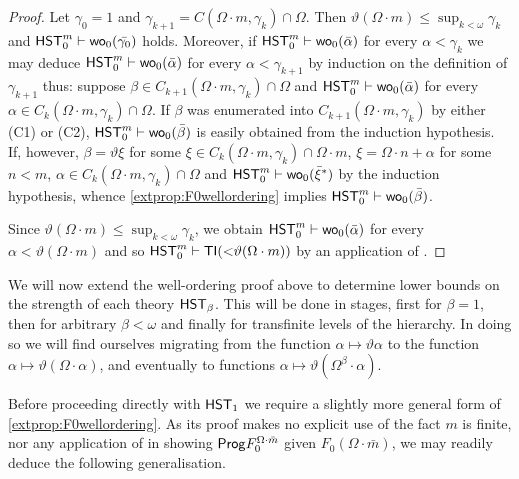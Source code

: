 \documentclass[UKenglish,cleveref,DIV=12]{scrartcl}
\theoremstyle{definition}
\theoremstyle{definition}
\begin{document}
\begin{proof}
Let $\gamma_0=1$ and $\gamma_{k+1}= C(\Omega\cdot m,\gamma_k)\cap\Omega$. Then
$\vartheta(\Omega\cdot m)\le\sup_{k<\omega}\gamma_k$ and
$\mathsf{HST}_0^m\vdash\mathsf{wo}_0(\bar{\gamma_0})$ holds. Moreover, if $\mathsf{HST}_0^m\vdash
\mathsf{wo}_0(\bar{\alpha})$ for every $\alpha<\gamma_k$ we may deduce $\mathsf{HST}_0^m\vdash
\mathsf{wo}_0(\bar{\alpha})$ for every $\alpha<\gamma_{k+1}$ by induction on the
definition of $\gamma_{k+1}$ thus: suppose $\beta\in C_{k+1}(\Omega\cdot
m,\gamma_k)\cap\Omega$ and $\mathsf{HST}_0^m\vdash \mathsf{wo}_0(\bar\alpha)$ for every
$\alpha\in C_{k}(\Omega\cdot m,\gamma_k)\cap\Omega$. If $\beta$ was enumerated
into $C_{k+1}(\Omega\cdot m,\gamma_k)$ by either (C1) or (C2),
$\mathsf{HST}_0^m\vdash\mathsf{wo}_0(\bar\beta)$ is easily obtained from the induction
hypothesis. If, however, $\beta=\vartheta\xi$ for some $\xi\in C_{k}(\Omega\cdot
m,\gamma_k)\cap\Omega\cdot m$, $\xi=\Omega\cdot n+\alpha$ for some $n<m$,
$\alpha\in C_{k}(\Omega\cdot m,\gamma_k)\cap\Omega$ and
$\mathsf{HST}_0^m\vdash\mathsf{wo}_0(\bar\xi^*)$ by the induction hypothesis, whence
\cref{extprop:F0wellordering} implies $\mathsf{HST}_0^m\vdash\mathsf{wo}_0(\bar\beta)$.

Since $\vartheta(\Omega\cdot m)\le\sup_{k<\omega}\gamma_k$, we obtain
$\mathsf{HST}_0^m\vdash\mathsf{wo}_0(\bar\alpha)$ for every $\alpha<\vartheta(\Omega\cdot m)$ and
so $\mathsf{HST}_0^m\vdash\mathsf{TI}(\mathord<\vartheta(\Omega\cdot m))$ by an application of
.
\end{proof}

We will now extend the well-ordering proof above to determine lower bounds on the strength of each
theory $\mathsf{HST}_\beta$. This will be done in stages, first for $\beta=1$, then for
arbitrary $\beta<\omega$ and finally for transfinite levels of the hierarchy. In
doing so we will find ourselves migrating from the function $\alpha\mapsto\vartheta\alpha$
to the function $\alpha\mapsto\vartheta(\Omega\cdot\alpha)$,
and eventually to functions $\alpha\mapsto\vartheta(\Omega^{\beta}\cdot\alpha)$.

Before proceeding directly with $\mathsf{HST}_1$ we require a slightly more general form
of \cref{extprop:F0wellordering}. As its proof makes no explicit use of the fact $m$ is finite,
nor any application of  in showing $\mathsf{Prog} F^{\Omega\cdot \bar m}_0$ given
$F_0(\Omega\cdot\bar m)$, we may readily deduce the following generalisation.
\end{document}
